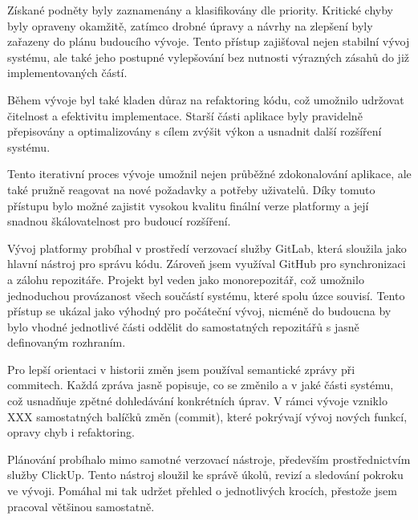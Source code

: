 Získané podněty byly zaznamenány a klasifikovány dle priority. 
Kritické chyby byly opraveny okamžitě, zatímco drobné úpravy a návrhy na zlepšení byly zařazeny do plánu budoucího vývoje. 
Tento přístup zajišťoval nejen stabilní vývoj systému, ale také jeho postupné vylepšování bez nutnosti výrazných zásahů do již implementovaných částí.

Během vývoje byl také kladen důraz na refaktoring kódu, což umožnilo udržovat čitelnost a efektivitu implementace. 
Starší části aplikace byly pravidelně přepisovány a optimalizovány s cílem zvýšit výkon a usnadnit další rozšíření systému.

Tento iterativní proces vývoje umožnil nejen průběžné zdokonalování aplikace, ale také pružně reagovat na nové požadavky a potřeby uživatelů. 
Díky tomuto přístupu bylo možné zajistit vysokou kvalitu finální verze platformy a její snadnou škálovatelnost pro budoucí rozšíření.

Vývoj platformy probíhal v prostředí verzovací služby GitLab, která sloužila jako hlavní nástroj pro správu kódu. 
Zároveň jsem využíval GitHub pro synchronizaci a zálohu repozitáře. 
Projekt byl veden jako monorepozitář, což umožnilo jednoduchou provázanost všech součástí systému, které spolu úzce souvisí. 
Tento přístup se ukázal jako výhodný pro počáteční vývoj, nicméně do budoucna by bylo vhodné jednotlivé části oddělit do samostatných repozitářů s jasně definovaným rozhraním.

Pro lepší orientaci v historii změn jsem používal semantické zprávy při commitech. 
Každá zpráva jasně popisuje, co se změnilo a v jaké části systému, což usnadňuje zpětné dohledávání konkrétních úprav. 
V rámci vývoje vzniklo XXX samostatných balíčků změn (commit), které pokrývají vývoj nových funkcí, opravy chyb i refaktoring.

Plánování probíhalo mimo samotné verzovací nástroje, především prostřednictvím služby ClickUp. 
Tento nástroj sloužil ke správě úkolů, revizí a sledování pokroku ve vývoji. 
Pomáhal mi tak udržet přehled o jednotlivých krocích, přestože jsem pracoval většinou samostatně.



